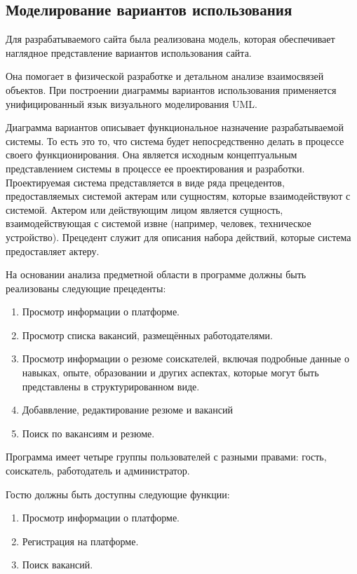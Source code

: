 \subsection{Моделирование вариантов использования}

Для разрабатываемого сайта была реализована модель, которая обеспечивает наглядное представление вариантов использования сайта.

Она помогает в физической разработке и детальном анализе взаимосвязей объектов. При построении диаграммы вариантов использования применяется унифицированный язык визуального моделирования UML.

Диаграмма вариантов описывает функциональное назначение разрабатываемой системы. То есть это то, что система будет непосредственно делать в процессе своего функционирования. Она является исходным концептуальным представлением системы в процессе ее проектирования и разработки. Проектируемая система представляется в виде ряда прецедентов, предоставляемых системой актерам или сущностям, которые взаимодействуют с системой. Актером или действующим лицом является сущность, взаимодействующая с системой извне (например, человек, техническое устройство). Прецедент служит для описания набора действий, которые система предоставляет актеру.

На основании анализа предметной области в программе должны быть реализованы следующие прецеденты:
\begin{enumerate}
\item Просмотр информации о платформе.
\item Просмотр списка вакансий, размещённых работодателями.
\item Просмотр информации о резюме соискателей, включая подробные данные о навыках, опыте, образовании и других аспектах, которые могут быть представлены в структурированном виде.
\item Добаввление, редактирование резюме и вакансий
\item Поиск по вакансиям и резюме.
\end{enumerate}

Программа имеет четыре группы пользователей с разными правами:
гость, соискатель, работодатель и администратор.

Гостю должны быть доступны следующие функции:

\begin{enumerate}
	\item Просмотр информации о платформе.
	\item Регистрация на платформе.
	\item Поиск вакансий.
\end{enumerate}

